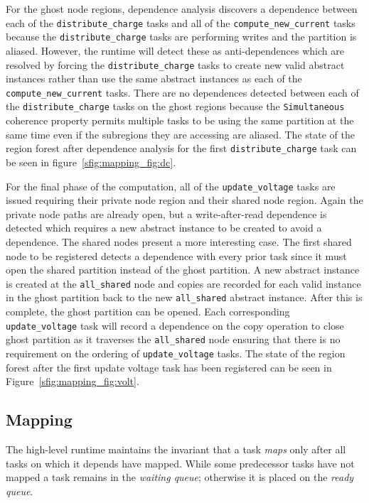 For the ghost node regions, dependence analysis discovers 
a dependence between each of the {\tt distribute\_charge} tasks and all of the
{\tt compute\_new\_current} tasks because the {\tt distribute\_charge} tasks are
performing writes and the partition is aliased.  However, the runtime will detect these as
anti-dependences which are resolved by forcing the {\tt distribute\_charge} tasks to
create new valid abstract instances rather than use the same abstract instances as
each of the {\tt compute\_new\_current} tasks.  There are no dependences detected
between each of the {\tt distribute\_charge} tasks on the ghost regions because
the {\tt Simultaneous} coherence property permits multiple tasks to be using the same
partition at the same time even if the subregions they are accessing are aliased.  The
state of the region forest after dependence analysis for the first {\tt distribute\_charge} task can
be seen in figure~\ref{sfig:mapping_fig:dc}.

For the final phase of the computation, all of the {\tt update\_voltage} tasks
are issued requiring their private node region and their shared node region.  Again
the private node paths are already open, but a write-after-read dependence is detected which
requires a new abstract instance to be created to avoid a dependence.  The
shared nodes present a more interesting case.  The first shared node to be registered
detects a dependence with every prior task since it must open the shared partition
instead of the ghost partition.  A new abstract instance is created at the 
{\tt all\_shared} node and copies are recorded for each valid instance in the ghost partition
back to the new {\tt all\_shared} abstract instance.  After this is complete, the
ghost partition can be opened.  Each corresponding {\tt update\_voltage} task will record
a dependence on the copy operation to close ghost partition as it traverses the {\tt all\_shared}
node ensuring that there is no requirement on the ordering of {\tt update\_voltage}
tasks.  The state of the region forest after the first update voltage task
has been registered can be seen in Figure~\ref{sfig:mapping_fig:volt}.

\subsection{Mapping}
\label{subsec:mapping}
The high-level runtime maintains the invariant that a task {\em maps} only after all tasks on which it depends have mapped. 
While some predecessor tasks have not mapped a task remains in the {\em waiting queue}; otherwise it is placed on the {\em ready queue}.  

